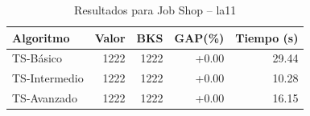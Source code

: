 \begin{table}[h]
\centering
\caption{Resultados para Job Shop -- la11}
\label{tab:jobshop_la11}
\begin{tabular}{lrrrr}
\hline
\textbf{Algoritmo} & \textbf{Valor} & \textbf{BKS} & \textbf{GAP(\%)} & \textbf{Tiempo (s)} \\
\hline
TS-Básico & 1222 & 1222 & +0.00 & 29.44 \\
TS-Intermedio & 1222 & 1222 & +0.00 & 10.28 \\
TS-Avanzado & 1222 & 1222 & +0.00 & 16.15 \\
\hline
\end{tabular}
\end{table}

